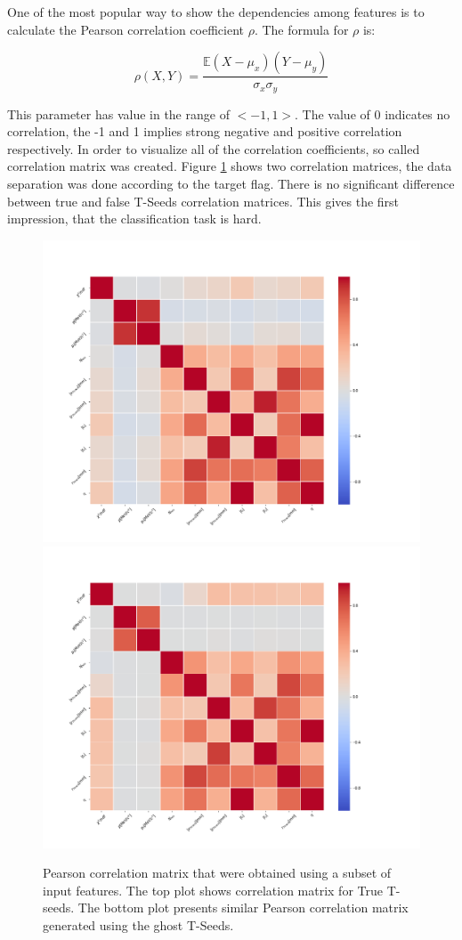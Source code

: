 One of the most popular way to show the dependencies among features is to calculate  the Pearson correlation coefficient $\rho$. The formula for $\rho$ is:

\begin{equation}
    \rho(X,Y) = \frac{\mathbb{E}(X-\mu_x)(Y-\mu_y)}{\sigma_x \sigma_y}
\end{equation}

This parameter has value in the range of $<-1,1>$. The value of 0 indicates no correlation, the -1 and 1 implies strong negative and positive correlation respectively. In order to visualize all of the correlation coefficients, so called correlation matrix was created. Figure \ref{fig:corrMatrix} shows two correlation matrices, the data separation was done according to the target flag. There is no significant difference between true and false T-Seeds correlation matrices. This gives the first impression, that the classification task is hard. 

\begin{figure}
  \centering
    \includegraphics[width=0.8\linewidth]{figures/corr_matrixTrue.png}\\
    \includegraphics[width=0.8\linewidth]{figures/corr_matrixFalse.png}

  \caption{Pearson  correlation matrix that were obtained using a subset of input features. The top plot shows correlation matrix for True T-seeds. The bottom plot presents similar Pearson correlation matrix generated using the ghost T-Seeds.  
\label{fig:corrMatrix}}  
\end{figure}

